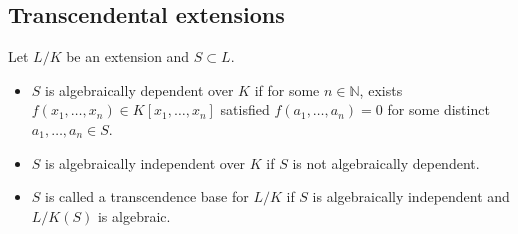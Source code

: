 \subsection{Transcendental extensions}

\begin{definition}
  Let $L/K$ be an extension and $S \subset L$.
  \begin{itemize}
    \item $S$ is algebraically dependent over $K$ if for some $n \in \mathbb{N}$,
      exists $f(x_1, \dots, x_n) \in K[x_1, \dots, x_n]$ satisfied
      $f(a_1, \dots, a_n) = 0$ for some distinct $a_1, \dots, a_n \in S$.
    \item $S$ is algebraically independent over $K$ if $S$ is not algebraically dependent.
    \item $S$ is called a transcendence base for $L/K$ if $S$ is algebraically independent
      and $L/K(S)$ is algebraic.
  \end{itemize}
\end{definition}

